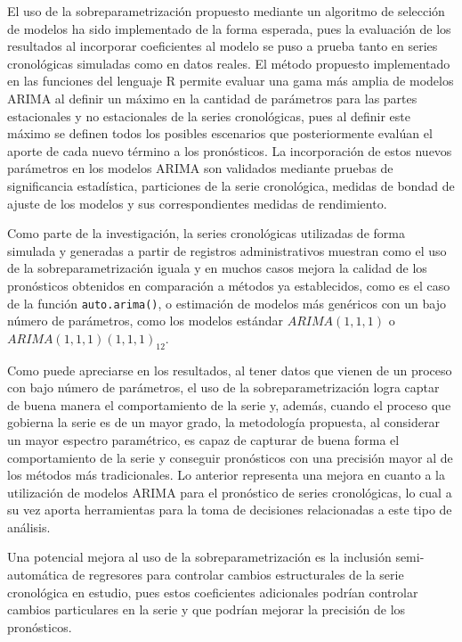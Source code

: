\documentclass[
]{article}
\begin{document}
El uso de la sobreparametrización propuesto mediante un algoritmo de
selección de modelos ha sido implementado de la forma esperada, pues la
evaluación de los resultados al incorporar coeficientes al modelo se
puso a prueba tanto en series cronológicas simuladas como en datos
reales. El método propuesto implementado en las funciones del lenguaje R
permite evaluar una gama más amplia de modelos ARIMA al definir un
máximo en la cantidad de parámetros para las partes estacionales y no
estacionales de la series cronológicas, pues al definir este máximo se
definen todos los posibles escenarios que posteriormente evalúan el
aporte de cada nuevo término a los pronósticos. La incorporación de
estos nuevos parámetros en los modelos ARIMA son validados mediante
pruebas de significancia estadística, particiones de la serie
cronológica, medidas de bondad de ajuste de los modelos y sus
correspondientes medidas de rendimiento.

Como parte de la investigación, la series cronológicas utilizadas de
forma simulada y generadas a partir de registros administrativos
muestran como el uso de la sobreparametrización iguala y en muchos casos
mejora la calidad de los pronósticos obtenidos en comparación a métodos
ya establecidos, como es el caso de la función \texttt{auto.arima()}, o
estimación de modelos más genéricos con un bajo número de parámetros,
como los modelos estándar \(ARIMA(1,1,1)\) o
\(ARIMA(1,1,1)(1,1,1)_{12}\).

Como puede apreciarse en los resultados, al tener datos que vienen de un
proceso con bajo número de parámetros, el uso de la sobreparametrización
logra captar de buena manera el comportamiento de la serie y, además,
cuando el proceso que gobierna la serie es de un mayor grado, la
metodología propuesta, al considerar un mayor espectro paramétrico, es
capaz de capturar de buena forma el comportamiento de la serie y
conseguir pronósticos con una precisión mayor al de los métodos más
tradicionales. Lo anterior representa una mejora en cuanto a la
utilización de modelos ARIMA para el pronóstico de series cronológicas,
lo cual a su vez aporta herramientas para la toma de decisiones
relacionadas a este tipo de análisis.

Una potencial mejora al uso de la sobreparametrización es la inclusión
semi-automática de regresores para controlar cambios estructurales de la
serie cronológica en estudio, pues estos coeficientes adicionales
podrían controlar cambios particulares en la serie y que podrían mejorar
la precisión de los pronósticos.
\end{document}
